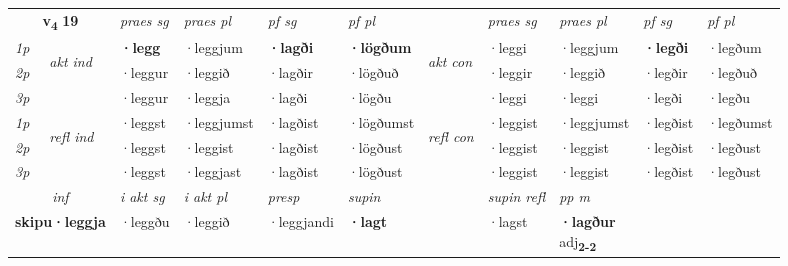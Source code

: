 \noindent
\begin{tabular}{lllllllllll} \toprule
\multicolumn{2}{c}{\textbf{v{\textsubscript{4}}} \Large{\textbf{19}}}  &  \textit{praes sg}  & \textit{praes pl}  &\textit{ pf sg} & \textit{pf pl} &  &  \textit{praes sg}  & \textit{praes pl}  & \textit{pf sg} & \textit{pf pl } \\*
	\cmidrule{3-6} \cmidrule{8-11}
 {\textit{1p}} & \multirow{3}{*}{\begin{turn}{90}\textit{akt ind}\end{turn}} & \textbf{·legg} & ·leggjum & \textbf{·lagði} & \textbf{·lögðum} & \multirow{3}{*}{\begin{turn}{90}\textit{akt con}\end{turn}} &·leggi & ·leggjum & \textbf{·legði} & ·legðum\\*
 {\textit{2p}} &  &  ·leggur  & ·leggið & ·lagðir & ·lögðuð & & ·leggir & ·leggið & ·legðir & ·legðuð \\*
{\textit{3p}} &  & ·leggur & ·leggja & ·lagði & ·lögðu & & ·leggi & ·leggi& ·legði & ·legðu \\*
\cmidrule{3-6} \cmidrule{8-11}
 {\textit{1p}} & \multirow{3}{*}{\begin{turn}{90}\textit{refl ind}\end{turn}}  & ·leggst & ·leggjumst & ·lagðist & ·lögðumst & \multirow{3}{*}{\begin{turn}{90}\textit{refl con}\end{turn}}  &·leggist & ·leggjumst & ·legðist & ·legðumst \\*
 {\textit{2p}} &  & ·leggst & ·leggist & ·lagðist & ·lögðust & &·leggist & ·leggist & ·legðist & ·legðust \\*
 {\textit{3p}}  & & ·leggst & ·leggjast & ·lagðist & ·lögðust & & ·leggist & ·leggist& ·legðist & ·legðust \\*
\cmidrule{3-6} \cmidrule{8-11}

   \multicolumn{2}{c}{\textit{inf}}  & \textit{i akt sg} & \textit{i akt pl}   & \textit{presp} & \textit{supin} && \textit{supin refl} & \textit{pp m} \\*
  \multicolumn{2}{c}{\textbf{skipu\allowbreak ·leggja}} & ·leggðu  & ·leggið   & ·leggjandi &  \textbf{·lagt} && ·lagst & \specialcell{\textbf{·lagður} \\ adj\textbf{\textsubscript{2-2}}} \\*
\end{tabular}

